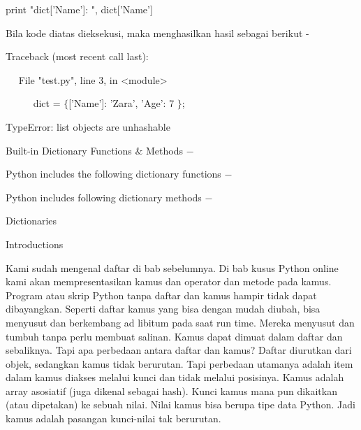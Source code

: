 \vspace{12pt}
\noindent 
 \hspace*{0.5in} print "dict['Name']: ", dict['Name'] \par
\noindent 
Bila kode diatas dieksekusi, maka menghasilkan hasil sebagai berikut - \par
\noindent 
 \hspace*{0.5in} Traceback (most recent call last): \par
\noindent 
~~  \hspace*{0.5in}  \hspace*{0.5in} File "test.py", line 3, in <module> \par
\noindent 
~~~~~  \hspace*{0.5in}  \hspace*{0.5in} dict =  $  \{  $['Name']: 'Zara', 'Age': 7 $  \}  $; \par
\noindent 
 \hspace*{0.5in} TypeError: list objects are unhashable \par
\vspace{12pt}
\vspace{12pt}
\vspace{12pt}
\noindent 
Built-in Dictionary Functions  $  \&  $ Methods  $ - $ \par
\noindent 
Python includes the following dictionary functions  $ - $ \par
\noindent 
Python includes following dictionary methods  $ - $ \par
\vspace{12pt}
\vspace{12pt}
\vspace{12pt}
\noindent 
Dictionaries \par
\vspace{12pt}
\noindent 
Introductions \par
\noindent 
Kami sudah mengenal daftar di bab sebelumnya. Di bab kusus Python online kami akan mempresentasikan kamus dan operator dan metode pada kamus. Program atau skrip Python tanpa daftar dan kamus hampir tidak dapat dibayangkan. Seperti daftar kamus yang bisa dengan mudah diubah, bisa menyusut dan berkembang ad libitum pada saat run time. Mereka menyusut dan tumbuh tanpa perlu membuat salinan. Kamus dapat dimuat dalam daftar dan sebaliknya. Tapi apa perbedaan antara daftar dan kamus? Daftar diurutkan dari objek, sedangkan kamus tidak berurutan. Tapi perbedaan utamanya adalah item dalam kamus diakses melalui kunci dan tidak melalui posisinya. Kamus adalah array asosiatif (juga dikenal sebagai hash). Kunci kamus mana pun dikaitkan (atau dipetakan) ke sebuah nilai. Nilai kamus bisa berupa tipe data Python. Jadi kamus adalah pasangan kunci-nilai tak berurutan. 

